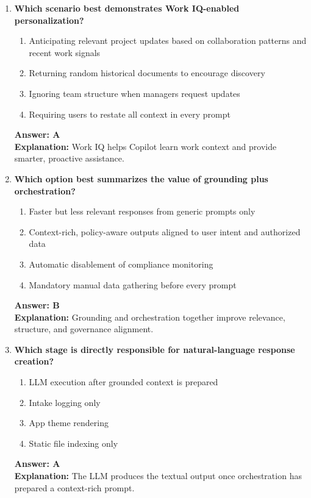 \documentclass[10pt]{article}
\begin{document}
\begin{enumerate}[leftmargin=*]
\item \textbf{Which scenario best demonstrates Work IQ-enabled personalization?}
\begin{enumerate}[label=\Alph*.]
  \item Anticipating relevant project updates based on collaboration patterns and recent work signals
  \item Returning random historical documents to encourage discovery
  \item Ignoring team structure when managers request updates
  \item Requiring users to restate all context in every prompt
\end{enumerate}
\textbf{Answer: A}\\
\textbf{Explanation:} Work IQ helps Copilot learn work context and provide smarter, proactive assistance.

\item \textbf{Which option best summarizes the value of grounding plus orchestration?}
\begin{enumerate}[label=\Alph*.]
  \item Faster but less relevant responses from generic prompts only
  \item Context-rich, policy-aware outputs aligned to user intent and authorized data
  \item Automatic disablement of compliance monitoring
  \item Mandatory manual data gathering before every prompt
\end{enumerate}
\textbf{Answer: B}\\
\textbf{Explanation:} Grounding and orchestration together improve relevance, structure, and governance alignment.

\item \textbf{Which stage is directly responsible for natural-language response creation?}
\begin{enumerate}[label=\Alph*.]
  \item LLM execution after grounded context is prepared
  \item Intake logging only
  \item App theme rendering
  \item Static file indexing only
\end{enumerate}
\textbf{Answer: A}\\
\textbf{Explanation:} The LLM produces the textual output once orchestration has prepared a context-rich prompt.

\end{enumerate}
\end{document}
